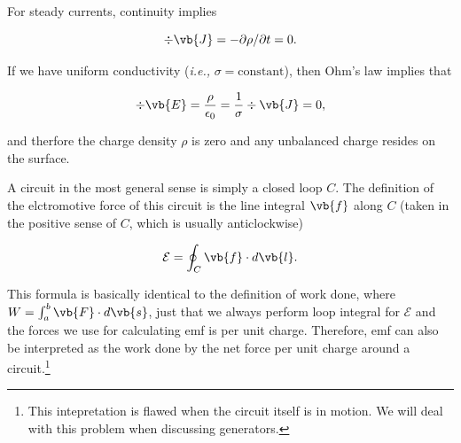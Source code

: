 \documentclass[english,a4paper,12pt]{report}
\begin{document}
For steady currents, continuity implies

\begin{equation}
    \div{\vb{J} } = - \partial \rho /\partial t = 0.
\end{equation}

If we have uniform conductivity (\textit{i.e.,} \(\sigma = \text{constant}  \)), then Ohm's law implies that 

\begin{equation}
    \div{\vb{E} } = \frac{\rho }{\epsilon_0 } = \frac{1}{\sigma } \div{\vb{J} } = 0, 
\end{equation}

and therfore the charge density \(\rho \) is zero and any unbalanced charge resides on the surface.


A circuit in the most general sense is simply a closed loop \(C\). The definition of the elctromotive force of this circuit is the line integral \(\vb{f} \) along \(C\) (taken in the positive sense of \(C\), which is usually anticlockwise)  

\begin{equation}
    \mathcal{E} = \oint_{C}  \vb{f} \cdot d \vb{l} .
\end{equation}

\begin{center}
\end{center}

This formula is basically identical to the definition of work done, where \(W = \int_{a}^{b} \vb{F} \cdot d \vb{s}  \), just that we always perform loop integral for \(\mathcal{E}\) and the forces we use for calculating emf is per unit charge. Therefore, emf can also be interpreted as the work done by the net force per unit charge around a circuit.\footnote{This intepretation is flawed when the circuit itself is in motion. We will deal with this problem when discussing generators.}
\end{document}
